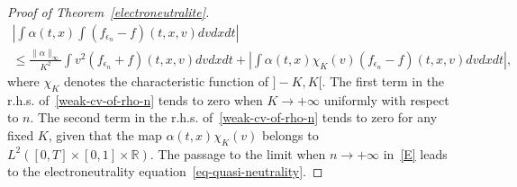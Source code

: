 \documentclass[10pt]{amsart}
\theoremstyle{definition}\newtheorem{defi}[theo]{Definition}\newtheorem{rema}[theo]{Remark}\newtheorem{exam}[theo]{Example}\newtheorem{exem}[theo]{Example}\newtheorem{nota}[theo]{Notation}
\newcommand{\R}{\mathbb{R}}
\begin{document}
\begin{proof}[{Proof of Theorem~\ref{electroneutralite}}]
\begin{multline}
\left |\int \alpha(t,x) \int \left(f_{\epsilon _n}-f\right)(t,x,v) dvdxdt \right|\\
\leq \frac{\|\alpha\|_{\infty}}{K^2} \int v^2\left(f_{\epsilon _n}+f\right)(t,x,v) dvdxdt + \left| \int \alpha(t,x) \chi_K(v)\left(f_{\epsilon _n}-f\right)(t,x,v) dvdxdt \right|,
\end{multline}
where $\chi_K$ denotes the characteristic function of $]-K,K[$. The first term in the r.h.s. of~\eqref{weak-cv-of-rho-n} tends to zero when $K \to +\infty $ uniformly with respect to $n$. The second term in the r.h.s. of~\eqref{weak-cv-of-rho-n} tends to zero for any fixed $K$, given that the map $\alpha(t,x) \chi_K(v)$ belongs to $L^2([0,T] \times [0,1] \times \R)$. The passage to the limit when $n \to +\infty $ in~\eqref{E} leads to the electroneutrality equation~\eqref{eq-quasi-neutrality}.
\end{proof}
\vspace{30pt}
\end{document}
